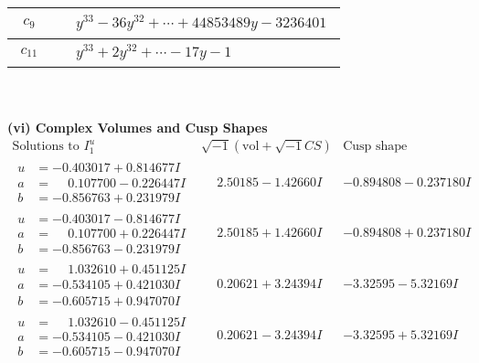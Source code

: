\documentclass[1p]{elsarticle_modified}
\theoremstyle{definition}
\newcommand{\I}{\sqrt{-1}}
\begin{document}
\begin{tabular}{m{50pt}|m{274pt}}
\hline $$\begin{aligned}c_{9}\end{aligned}$$&$\begin{aligned}
&y^{33}-36 y^{32}+\cdots+44853489 y-3236401
\end{aligned}$\\
\hline $$\begin{aligned}c_{11}\end{aligned}$$&$\begin{aligned}
&y^{33}+2 y^{32}+\cdots-17 y-1
\end{aligned}$\\
\hline
\end{tabular}\\~\\
\newpage\flushleft \textbf{(vi) Complex Volumes and Cusp Shapes}
$$\begin{array}{c|c|c}  
\text{Solutions to }I^u_{1}& \I (\text{vol} + \sqrt{-1}CS) & \text{Cusp shape}\\
 \hline 
\begin{aligned}
u &= -0.403017 + 0.814677 I \\
a &= \phantom{-}0.107700 - 0.226447 I \\
b &= -0.856763 + 0.231979 I\end{aligned}
 & \phantom{-}2.50185 - 1.42660 I & -0.894808 - 0.237180 I \\ \hline\begin{aligned}
u &= -0.403017 - 0.814677 I \\
a &= \phantom{-}0.107700 + 0.226447 I \\
b &= -0.856763 - 0.231979 I\end{aligned}
 & \phantom{-}2.50185 + 1.42660 I & -0.894808 + 0.237180 I \\ \hline\begin{aligned}
u &= \phantom{-}1.032610 + 0.451125 I \\
a &= -0.534105 + 0.421030 I \\
b &= -0.605715 + 0.947070 I\end{aligned}
 & \phantom{-}0.20621 + 3.24394 I & -3.32595 - 5.32169 I \\ \hline\begin{aligned}
u &= \phantom{-}1.032610 - 0.451125 I \\
a &= -0.534105 - 0.421030 I \\
b &= -0.605715 - 0.947070 I\end{aligned}
 & \phantom{-}0.20621 - 3.24394 I & -3.32595 + 5.32169 I \\ \hline\begin{aligned}

\end{aligned}
\end{array}$$
\end{document}
